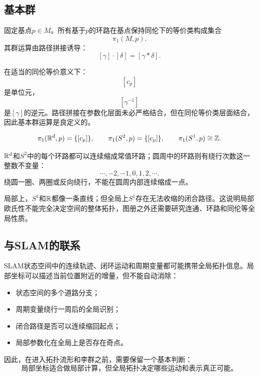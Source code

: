\subsection{基本群}

\begin{definition}[基本群]
固定基点$p\in M$。所有基于$p$的环路在基点保持同伦下的等价类构成集合
\[
    \pi_1(M,p).
\]
其群运算由路径拼接诱导：
\[
    [\gamma]\cdot[\delta]
    =
    [\gamma*\delta].
\]
\end{definition}

在适当的同伦等价意义下：
\[
    [c_p]
\]
是单位元，
\[
    [\gamma^{-1}]
\]
是$[\gamma]$的逆元。路径拼接在参数化层面未必严格结合，但在同伦等价类层面结合，因此基本群运算是良定义的。

\begin{theorem}[基本群的典型例子]
\[
    \pi_1(\mathbb{R}^d,p)=\{[c_p]\},
    \qquad
    \pi_1(S^2,p)=\{[c_p]\},
    \qquad
    \pi_1(S^1,p)\cong\mathbb{Z}.
\]
\end{theorem}

$\mathbb{R}^d$和$S^2$中的每个环路都可以连续缩成常值环路；圆周中的环路则有绕行次数这一整数不变量：
\[
    \cdots,-2,-1,0,1,2,\cdots.
\]
绕圆一圈、两圈或反向绕行，不能在圆周内部连续缩成一点。

\begin{remark}[基本群与全局结构]
局部上，$S^1$和$\mathbb{R}$都像一条直线；但全局上$S^1$存在无法收缩的闭合路径。这说明局部欧氏性不能完全决定空间的整体拓扑，图册之外还需要研究连通、环路和同伦等全局性质。
\end{remark}

\subsection{与SLAM的联系}

SLAM状态空间中的连续轨迹、闭环运动和周期变量都可能携带全局拓扑信息。局部坐标可以描述当前位置附近的增量，但不能自动消除：

\begin{itemize}
    \item 状态空间的多个道路分支；
    \item 周期变量绕行一周后的全局识别；
    \item 闭合路径是否可以连续缩回起点；
    \item 局部参数化在全局上是否存在奇点。
\end{itemize}

因此，在进入拓扑流形和李群之前，需要保留一个基本判断：
\[
    \text{局部坐标适合做局部计算，但全局拓扑决定哪些运动和表示真正可能。}
\]

